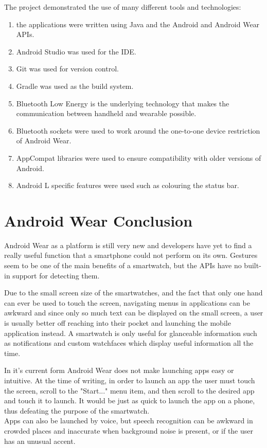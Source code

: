 The project demonstrated the use of many different tools and technologies:
\begin{enumerate}
\item the applications were written using Java and the Android and Android
    Wear APIs.
\item Android Studio was used for the IDE.
\item Git was used for version control.
\item Gradle was used as the build system.
\item Bluetooth Low Energy is the underlying technology that makes the
    communication between handheld and wearable possible.
\item Bluetooth sockets were used to work around the one-to-one device
    restriction of Android Wear.
\item AppCompat libraries were used to ensure compatibility with older versions
    of Android.
\item Android L specific features were used such as colouring the status bar.
\end{enumerate}

\section{Android Wear Conclusion}

Android Wear as a platform is still very new and developers have yet to find a
really useful function that a smartphone could not perform on its own. Gestures
seem to be one of the main benefits of a smartwatch, but the APIs have no 
built-in support for detecting them.

Due to the small screen size of the smartwatches, and the fact that only one
hand can ever be used to touch the screen, navigating menus in applications can
be awkward and since only so much text can be displayed on the small screen, a
user is usually better off reaching into their pocket and launching the mobile
application instead. A smartwatch is only useful for glanceable information such
as notifications and custom watchfaces which display useful information all the
time.

In it's current form Android Wear does not make launching apps easy or
intuitive. At the time of writing, in order to launch an app the user must touch
the screen, scroll to the "Start..." menu item, and then scroll to the desired
app and touch it to launch. It would be just as quick to launch the app on a
phone, thus defeating the purpose of the smartwatch.\\
Apps can also be launched by voice, but speech recognition can be awkward in
crowded places and inaccurate when background noise is present, or if the user
has an unusual accent.

